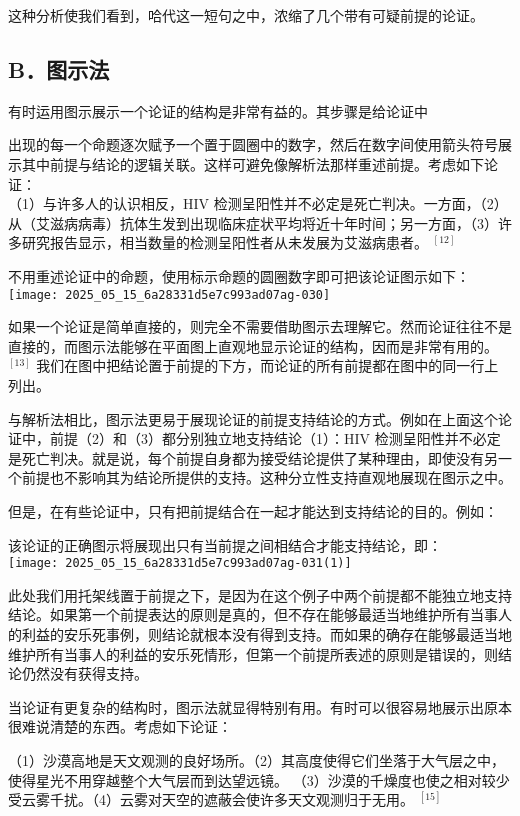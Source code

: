 这种分析使我们看到，哈代这一短句之中，浓缩了几个带有可疑前提的论证。

\subsection{B．图示法}
有时运用图示展示一个论证的结构是非常有益的。其步骤是给论证中

出现的每一个命题逐次赋予一个置于圆圈中的数字，然后在数字间使用箭头符号展示其中前提与结论的逻辑关联。这样可避免像解析法那样重述前提。考虑如下论证：\\
（1）与许多人的认识相反，HIV 检测呈阳性并不必定是死亡判决。一方面，（2）从（艾滋病病毒）抗体生发到出现临床症状平均将近十年时间；另一方面，（3）许多研究报告显示，相当数量的检测呈阳性者从未发展为艾滋病患者。 ${ }^{[12]}$

不用重述论证中的命题，使用标示命题的圆圈数字即可把该论证图示如下：\\
\texttt{[image: 2025\_05\_15\_6a28331d5e7c993ad07ag-030]}

如果一个论证是简单直接的，则完全不需要借助图示去理解它。然而论证往往不是直接的，而图示法能够在平面图上直观地显示论证的结构，因而是非常有用的。 ${ }^{[13]}$ 我们在图中把结论置于前提的下方，而论证的所有前提都在图中的同一行上列出。

与解析法相比，图示法更易于展现论证的前提支持结论的方式。例如在上面这个论证中，前提（2）和（3）都分别独立地支持结论（1）：HIV 检测呈阳性并不必定是死亡判决。就是说，每个前提自身都为接受结论提供了某种理由，即使没有另一个前提也不影响其为结论所提供的支持。这种分立性支持直观地展现在图示之中。

但是，在有些论证中，只有把前提结合在一起才能达到支持结论的目的。例如：

该论证的正确图示将展现出只有当前提之间相结合才能支持结论，即：\\
\texttt{[image: 2025\_05\_15\_6a28331d5e7c993ad07ag-031(1)]}

此处我们用托架线置于前提之下，是因为在这个例子中两个前提都不能独立地支持结论。如果第一个前提表达的原则是真的，但不存在能够最适当地维护所有当事人的利益的安乐死事例，则结论就根本没有得到支持。而如果的确存在能够最适当地维护所有当事人的利益的安乐死情形，但第一个前提所表述的原则是错误的，则结论仍然没有获得支持。

当论证有更复杂的结构时，图示法就显得特别有用。有时可以很容易地展示出原本很难说清楚的东西。考虑如下论证：

\begin{displayquote}
（1）沙漠高地是天文观测的良好场所。（2）其高度使得它们坐落于大气层之中，使得星光不用穿越整个大气层而到达望远镜。 （3）沙漠的千燥度也使之相对较少受云雾千扰。（4）云雾对天空的遮蔽会使许多天文观测归于无用。 ${ }^{[15]}$
\end{displayquote}

